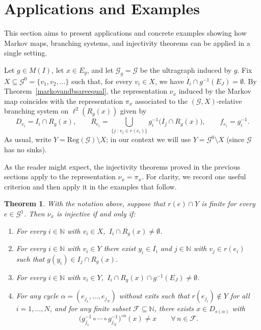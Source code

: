 \documentclass[12pt, reqno]{amsart}
\newtheorem{theorem}{Theorem}[section]
\theoremstyle{definition}
\theoremstyle{remark}
\numberwithin{equation}{section}
\begin{document}
\section{Applications and Examples}

This section aims to present applications and concrete examples showing how
Markov maps, branching systems, and injectivity theorems can be applied in a
single setting.

Let $g \in M(I)$, let $x \in E_g$, and let $\mathcal{G}_g=\mathcal{G}$ be the
ultragraph induced by $g$. Fix $X \subseteq \mathcal{G}^0=\{v_1,v_2,\ldots\}$
such that, for every $v_i \in X$, we have
$\mathring{I_i}\cap g^{-1}(E_J)=\emptyset$.
By Theorem~\ref{markovandbsareequal}, the representation $\nu_x$ induced by the
Markov map coincides with the representation $\pi_x$ associated to the
$(\mathcal{G},X)$-relative branching system on $\ell^2(R_g(x))$ given by
\[
D_{v_i}=I_i\cap R_g(x),\qquad
R_{e_i}=\bigcup_{\{j\,:\, v_j\in r(e_i)\}} g_i^{-1}\big(I_j\cap R_g(x)\big),
\qquad
f_{e_i}=g_i^{-1}.
\]
As usual, write $Y=\mathrm{Reg}(\mathcal{G})\setminus X$; in our context we will
use $Y=\mathcal{G}^0\setminus X$ (since $\mathcal{G}$ has no sinks).

As the reader might expect, the injectivity theorems proved in the previous
sections apply to the representation $\nu_x=\pi_x$. For clarity, we record one
useful criterion and then apply it in the examples that follow.

\begin{theorem}\label{injectivityformarkovreps}
With the notation above, suppose that $r(e)\cap Y$ is finite for every
$e\in\mathcal{G}^1$. Then $\nu_x$ is injective if and only if:
\begin{enumerate}
    \item For every $i\in\mathbb{N}$ with $v_i\in X$,
          \,$I_i\cap R_g(x)\neq\emptyset$.
    \item For every $i\in\mathbb{N}$ with $v_i\in Y$ there exist
          $y_i\in I_i$ and $j\in\mathbb{N}$ with $v_j\in r(e_i)$ such that
          $g(y_i)\in I_j\cap R_g(x)$.
    \item For every $i\in\mathbb{N}$ with $v_i\in Y$,
          \,$I_i\cap R_g(x)\cap g^{-1}(E_J)\neq\emptyset$.
    \item For any cycle $\alpha=(e_{j_1},\ldots,e_{j_N})$ without exits such
          that $r(e_{j_i})\notin Y$ for all $i=1,\ldots,N$, and for any finite
          subset $\mathcal{F}\subseteq\mathbb{N}$, there exists
          $x\in D_{s(\alpha)}$ with
          \[
             \big(g_{j_1}^{-1}\circ\cdots\circ g_{j_N}^{-1}\big)^{\circ n}(x)\neq x
             \qquad \forall\, n\in\mathcal{F}.
          \]
\end{enumerate}
\end{theorem}
\end{document}
